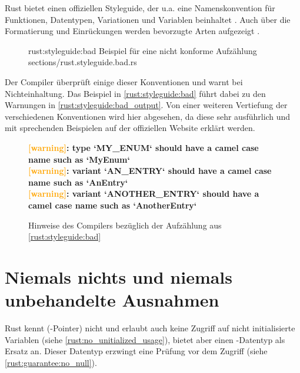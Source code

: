 Rust bietet einen offiziellen Styleguide, der u.a. eine Namenskonvention für Funktionen, Datentypen, Variationen und Variablen beinhaltet \cite{rust:styleguide:naming}.
Auch über die Formatierung und Einrückungen werden bevorzugte Arten aufgezeigt \cite{rust:styleguide}.

\begin{figure}[H]
	\rustcinclude
		{rust:styleguide:bad}
		{Beispiel für eine nicht konforme Aufzählung}
		{sections/rust.styleguide.bad.rs}
\end{figure}

Der Compiler überprüft einige dieser Konventionen und warnt bei Nichteinhaltung.
Das Beispiel in \autoref{rust:styleguide:bad} führt dabei zu den Warnungen in \autoref{rust:styleguide:bad_output}.
Von einer weiteren Vertiefung der verschiedenen Konventionen wird hier abgesehen, da diese sehr ausführlich und mit sprechenden Beispielen auf der offiziellen Website erklärt werden.

\begin{figure}[H]
	\begin{tcolorbox}[colback=codeBackground,boxrule=0pt,arc=0pt]
	\begin{scriptsize}
		\textbf{\textcolor{orange}{[warning]}: type `MY\_ENUM` should have a camel case name such as `MyEnum`} \\
		\textbf{\textcolor{orange}{[warning]}: variant `AN\_ENTRY` should have a camel case name such as `AnEntry`} \\
		\textbf{\textcolor{orange}{[warning]}: variant `ANOTHER\_ENTRY` should have a camel case name such as `AnotherEntry`}
	\end{scriptsize}
	\end{tcolorbox}
	\caption{Hinweise des Compilers bezüglich der Aufzählung aus \autoref{rust:styleguide:bad}}
	\label{rust:styleguide:bad_output}
\end{figure}


\section{Niemals nichts und niemals unbehandelte Ausnahmen}
\label{rust:no_null}

Rust kennt (-Pointer) nicht und erlaubt auch keine Zugriff auf nicht initialisierte Variablen (siehe \autoref{rust:no_unitialized_usage}), bietet aber einen -Datentyp als Ersatz an.
Dieser Datentyp erzwingt eine Prüfung vor dem Zugriff (siehe \autoref{rust:guarantee:no_null}).

